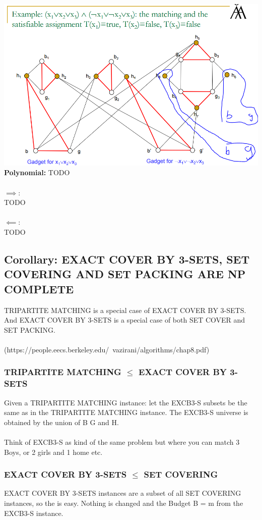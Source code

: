 \includegraphics[scale=0.5]{tripartite}
\\
\textbf{Polynomial:} TODO
\\\\
$\implies:$ \\ TODO
\\\\ 
$\impliedby:$ \\ TODO

\newpage
\subsection{Corollary: EXACT COVER BY 3-SETS, SET COVERING AND SET PACKING ARE NP COMPLETE}
TRIPARTITE MATCHING is a special case of EXACT COVER BY 3-SETS. And EXACT COVER BY 3-SETS is a special case of both SET COVER and SET PACKING.\\\\ (https://people.eecs.berkeley.edu/~vazirani/algorithms/chap8.pdf)
\subsubsection{TRIPARTITE MATCHING $\le$ EXACT COVER BY 3-SETS}
Given a TRIPARTITE MATCHING instance: let the EXCB3-S subsets be the same as in the TRIPARTITE MATCHING instance. The EXCB3-S universe is obtained by the union of B G and H.\\\\
Think of EXCB3-S as kind of the same problem but where you can match 3 Boys, or 2 girls and 1 home etc. 
\subsubsection{EXACT COVER BY 3-SETS $\le$ SET COVERING}
EXACT COVER BY 3-SETS instances are a subset of all SET COVERING instances, so the is easy. Nothing is changed and the Budget B = m from the EXCB3-S instance.

